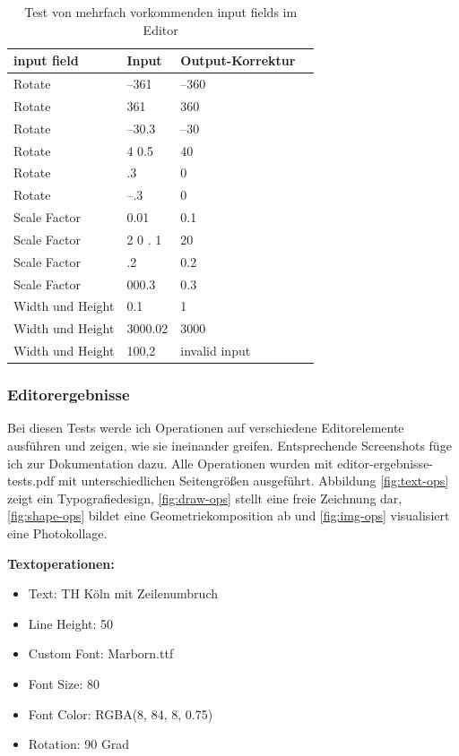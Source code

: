 \begin{table}[!htbp]
	\centering
	\begin{tabular}{|p{4cm}|p{3cm}|p{3cm}|p{3cm}|}
		\hline
		\textbf{input field}	& \textbf{Input} 	& \textbf{Output-Korrektur}		\\ 
		\hline
		Rotate					& –361 						& –360  				\\
		Rotate					& 361 						& 360 					\\ 
		Rotate					& –30.3 					& –30  					\\
		Rotate					& 4 0.5 					& 40 					\\
		Rotate					& .3 						& 0 					\\ 
		Rotate					& –.3 						& 0 					\\ 
		Scale Factor			& 0.01						& 0.1 					\\
		Scale Factor			& 2 0 . 1					& 20 					\\
		Scale Factor			& .2						& 0.2 					\\
		Scale Factor			& 000.3						& 0.3 					\\
		Width und Height		& 0.1						& 1 					\\
		Width und Height		& 3000.02					& 3000 					\\
		Width und Height		& 100,2						& invalid input 		\\
		\hline
	\end{tabular}
	\caption{Test von mehrfach vorkommenden input fields im Editor}
	\label{table:editor-input}
\end{table}

\subsubsection{Editorergebnisse}
Bei diesen Tests werde ich Operationen auf verschiedene Editorelemente ausführen und zeigen, wie sie ineinander greifen. Entsprechende Screenshots füge ich zur Dokumentation dazu. Alle Operationen wurden mit editor-ergebnisse-tests.pdf mit unterschiedlichen Seitengrößen ausgeführt. Abbildung \ref{fig:text-ops} zeigt ein Typografiedesign, \ref{fig:draw-ops} stellt eine freie Zeichnung dar, \ref{fig:shape-ops} bildet eine Geometriekomposition ab und \ref{fig:img-ops} visualisiert eine Photokollage.

\textbf{Textoperationen:}
\begin{itemize}
	\item Text: TH Köln mit Zeilenumbruch
	\item Line Height: 50
	\item Custom Font: Marborn.ttf
	\item Font Size: 80
	\item Font Color: RGBA(8, 84, 8, 0.75)
	\item Rotation: 90 Grad
\end{itemize}

